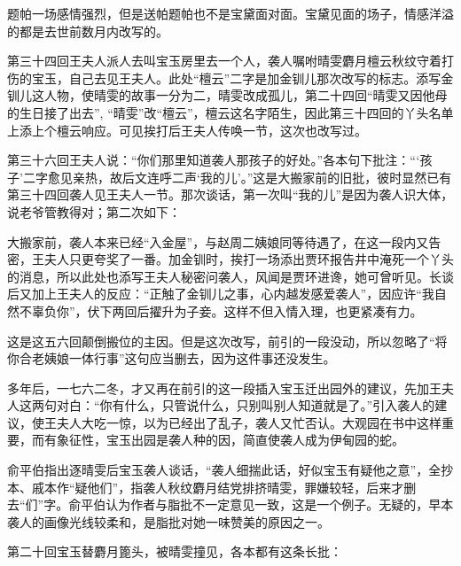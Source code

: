\par 题帕一场感情强烈，但是送帕题帕也不是宝黛面对面。宝黛见面的场子，情感洋溢的都是去世前数月内改写的。
\par 第三十四回王夫人派人去叫宝玉房里去一个人，袭人嘱咐晴雯麝月檀云秋纹守着打伤的宝玉，自己去见王夫人。此处“檀云”二字是加金钏儿那次改写的标志。添写金钏儿这人物，使晴雯的故事一分为二，晴雯改成孤儿，第二十四回“晴雯又因他母的生日接了出去”, “晴雯”改“檀云”，檀云这名字陌生，因此第三十四回的丫头名单上添上个檀云响应。可见挨打后王夫人传唤一节，这次也改写过。
\par 第三十六回王夫人说：“你们那里知道袭人那孩子的好处。”各本句下批注：“‘孩子’二字愈见亲热，故后文连呼二声‘我的儿’。”这是大搬家前的旧批，彼时显然已有第三十四回袭人见王夫人一节。那次谈话，第一次叫“我的儿”是因为袭人识大体，说老爷管教得对；第二次如下：
\par 大搬家前，袭人本来已经“入金屋”，与赵周二姨娘同等待遇了，在这一段内又告密，王夫人只更夸奖了一番。加金钏时，挨打一场添出贾环报告井中淹死一个丫头的消息，所以此处也添写王夫人秘密问袭人，风闻是贾环进谗，她可曾听见。长谈后又加上王夫人的反应：“正触了金钏儿之事，心内越发感爱袭人”，因应许“我自然不辜负你”，伏下两回后擢升为子妾。这样不但入情入理，也更紧凑有力。
\par 这是这五六回颠倒搬位的主因。但是这次改写，前引的一段没动，所以忽略了“将你合老姨娘一体行事”这句应当删去，因为这件事还没发生。
\par 多年后，一七六二冬，才又再在前引的这一段插入宝玉迁出园外的建议，先加王夫人这两句对白：“你有什么，只管说什么，只别叫别人知道就是了。”引入袭人的建议，使王夫人大吃一惊，以为已经出了乱子，袭人又忙否认。大观园在书中这样重要，而有象征性，宝玉出园是袭人种的因，简直使袭人成为伊甸园的蛇。
\par 俞平伯指出逐晴雯后宝玉袭人谈话，“袭人细揣此话，好似宝玉有疑他之意”，全抄本、戚本作“疑他们”，指袭人秋纹麝月结党排挤晴雯，罪嫌较轻，后来才删去“们”字。俞平伯认为作者与脂批不一定意见一致，这是一个例子。无疑的，早本袭人的画像光线较柔和，是脂批对她一味赞美的原因之一。
\par 第二十回宝玉替麝月篦头，被晴雯撞见，各本都有这条长批：
